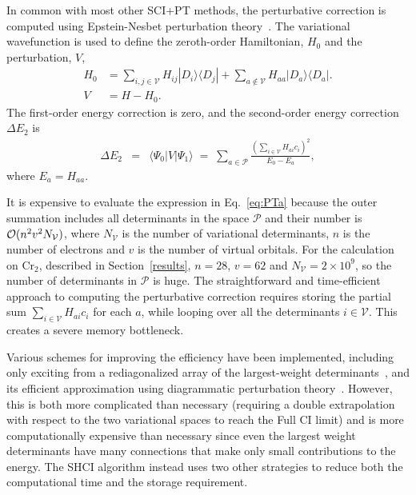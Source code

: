 \documentclass[%
reprint,
 superscriptaddress,
 amsmath,amssymb,
 aps,
]{revtex4-1}
\def\beq{\begin{eqnarray}}
\def\eeq{\end{eqnarray}}
\def\V{\mathcal{V}}
\def\P{\mathcal{P}}
\begin{document}
In common with most other SCI+PT methods, the perturbative correction is
computed using Epstein-Nesbet perturbation theory~\cite{Eps-PR-26,Nes-PRS-55}.
The variational wavefunction is used to define the zeroth-order Hamiltonian, $H_0$ and the perturbation, $V$,
\begin{align}
H_0 &= \sum_{i,j \in \V} H_{ij} |D_i\rangle\langle D_j| + \sum_{a \notin \V } H_{aa} |D_a\rangle\langle D_a|. \nonumber\\
V &= H - H_0 . \label{eq:part}
\end{align}
The first-order energy correction is zero, and the second-order energy correction $\Delta E_{2}$ is
\beq
 \Delta E_{2} &=& \langle\Psi_0|V|\Psi_1\rangle
 \;=\; \sum_{a \in \P} \frac{\left(\sum_{i \in \V} H_{ai} c_i\right)^2}{E_0 - E_a},
\label{eq:PTa}
\eeq
where $E_a=H_{aa}$.

It is expensive to evaluate the expression in Eq.~\ref{eq:PTa} because the outer summation includes all determinants in the space $\P$ and their number is
${\cal O}(n^2v^2N_\V)$, where $N_\V$ is the number of variational determinants, $n$ is the number of electrons and $v$ is
the number of virtual orbitals. For the calculation on Cr$_2$, described in Section~\ref{results},
$n=28$, $v=62$ and $N_\V=2 \times 10^9$, so the number of determinants in $\P$ is huge.
The straightforward
and time-efficient approach to computing the perturbative correction requires storing
the partial sum $\sum_{i \in \V} H_{ai} c_i$ for each $a$, while
looping over all the determinants $i \in \V$. This creates a severe memory bottleneck.

Various schemes for improving the efficiency have been implemented, including only exciting from
a rediagonalized array of the largest-weight determinants~\cite{EvaDauMal-CP-83}, and its efficient approximation using
diagrammatic perturbation theory~\cite{CimPer-JCoP-87}.
However, this is both more complicated than necessary (requiring a double extrapolation with respect to the two
variational spaces to reach the Full CI limit) and is more computationally expensive than necessary since even
the largest weight determinants have many connections that make only small contributions to the energy.
The SHCI algorithm instead uses two other strategies to reduce both the computational time and the storage requirement.
\end{document}
